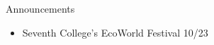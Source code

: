 \begin{frame}{Announcements}
    \begin{itemize}
        \item Seventh College's EcoWorld Festival 10/23
    \end{itemize}
\end{frame}
